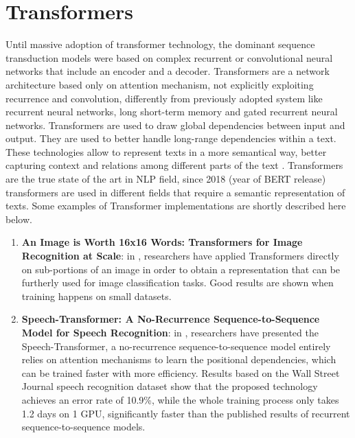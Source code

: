 \documentclass[\main/main.tex]{subfiles}
\begin{document}
\section{Transformers}
Until massive adoption of transformer technology, the dominant sequence transduction models were based on complex recurrent or convolutional neural networks that include an encoder and a decoder.
Transformers are a network architecture based only on attention mechanism, not explicitly exploiting recurrence and convolution, differently from previously adopted system like recurrent neural networks, long short-term memory and gated recurrent neural networks. Transformers are used to draw global dependencies between input and output. They are used to better handle long-range dependencies within a text. These technologies allow to represent texts in a more semantical way, better capturing context and relations among different parts of the text \cite{vaswani2017attention}. Transformers are the true state of the art in NLP field, since 2018 (year of BERT \cite{devlin2018bert}\cite{bert_blog_post} release) transformers are used in different fields that require a semantic representation of texts. Some examples of Transformer implementations are shortly described here below.
\begin{enumerate}
    \item \textbf{An Image is Worth 16x16 Words: Transformers for Image Recognition at Scale}: in \cite{Dosovitskiy2021AnII}, researchers have applied Transformers directly on sub-portions of an image in order to obtain a representation that can be furtherly used for image classification tasks. Good results are shown when training happens on small datasets.
    \item \textbf{Speech-Transformer: A No-Recurrence Sequence-to-Sequence Model for Speech Recognition}: in \cite{Dong2018SpeechTransformerAN}, researchers have presented the Speech-Transformer, a no-recurrence sequence-to-sequence model entirely relies on attention mechanisms to learn the positional dependencies, which can be trained faster with more efficiency. Results based on the Wall Street Journal speech recognition dataset show that the proposed technology achieves an error rate of 10.9\%, while the whole training process only takes 1.2 days on 1 GPU, significantly faster than the published results of recurrent sequence-to-sequence models. 
\end{enumerate}

\newpage
\end{document}
